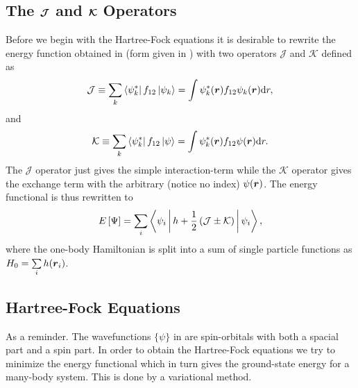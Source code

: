     \subsection{The $\boldsymbol{{\mathcal{J}}}$ and $\boldsymbol{{\mathcal{K}}}$ Operators}
        Before we begin with the Hartree-Fock equations it is desirable to
        rewrite the energy function obtained in  (form
        given in ) with two operators $\mathcal{J}$ and
        $\mathcal{K}$ defined as
            \begin{equation}
                \mathcal{J} \equiv \sum_k
                \bra{\psi^{*}_k}f_{12}\ket{\psi_k} = \int
                \psi^{*}_k(\boldsymbol{{r}})f_{12}\psi_k(\boldsymbol{{r}})\mathrm{d} r,
            \end{equation}
        and
            \begin{equation}
                \mathcal{K} \equiv \sum_k
                \bra{\psi^{*}_k}f_{12}\ket{\psi} = \int
                \psi^{*}_k(\boldsymbol{{r}})f_{12}\psi(\boldsymbol{{r}})\mathrm{d} r.
            \end{equation}
        The $\mathcal{J}$ operator just gives the simple interaction-term while
        the $\mathcal{K}$ operator gives the exchange term with the arbitrary
        (notice no index) $\psi(\boldsymbol{{r}})$. The energy functional is thus
        rewritten to
            \begin{equation}
                E\left[\Psi\right] = \sum_i\Braket{\psi_i | h +
                \frac{1}{2}\left(\mathcal{J} \pm \mathcal{K}\right) | \psi_i},
                \label{eq:JKEfunc}
            \end{equation}
        where the one-body Hamiltonian is split into a sum of single particle
        functions as $H_0 = \sum\limits_i h(\boldsymbol{{r}}_i)$.

    \subsection{Hartree-Fock Equations}
        As a reminder. The wavefunctions $\{\psi\}$ in  are
        spin-orbitals with both a spacial part and a spin part. In order to
        obtain the Hartree-Fock equations we try to minimize the energy
        functional which in turn gives the ground-state energy for a many-body
        system. This is done by a variational method.

